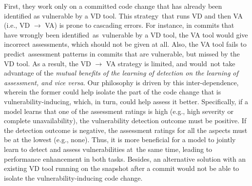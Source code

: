 First, they work only on a committed code change that has already been identified as vulnerable by a VD tool.
This strategy~that runs VD and then VA (i.e., VD $\rightarrow$ VA)
is prone to cascading errors.
For instance, in commits that have wrongly been
identified~as~vulnerable by a VD tool, the VA tool would give
incorrect assessments, which should not be given at all.  Also, the VA
tool fails to predict~assessment patterns in commits that are
vulnerable, but missed by the VD tool. As a result, the VD
$\rightarrow$ VA strategy is limited, and would~not take advantage of
the {\em mutual benefits of the learning of detection on the learning
  of assessment, and vice versa}.  Our philosophy is driven by this
inter-dependence, wherein the former could help isolate the part of
the code change that is vulnerability-inducing, which, in turn, could
help assess it better. Specifically, if a model learns that one of the
assessment ratings is high (e.g., high severity or complete
unavailability), the vulnerability detection outcome must be
positive. If the detection outcome is negative, the assessment ratings
for all the aspects must be at the lowest (e.g., none). Thus, it is
more beneficial for a model to jointly learn to detect and assess
vulnerabilities at~the same time, leading to performance enhancement
in both tasks. Besides, an alternative solution with an existing VD
tool running on the snapshot after a commit would not be able to
isolate the vulnerability-inducing code change.

